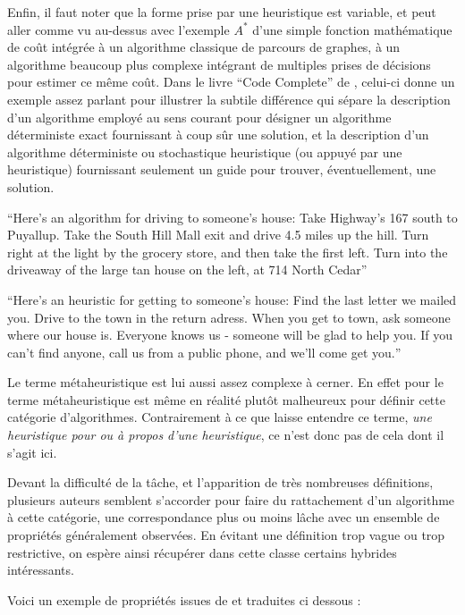 Enfin, il faut noter que la forme prise par une heuristique est variable, et peut aller comme vu au-dessus avec l'exemple $A^*$ d'une simple fonction mathématique de coût intégrée à un algorithme classique de parcours de graphes, à un algorithme beaucoup plus complexe intégrant de multiples prises de décisions pour estimer ce même coût. Dans le livre \enquote{Code Complete} de \textcite[12]{McConnell2004}, celui-ci donne un exemple assez parlant pour illustrer la subtile différence qui sépare la description d'un algorithme employé au sens courant pour désigner un algorithme déterministe exact fournissant à coup sûr une solution, et la description d'un algorithme déterministe ou stochastique heuristique (ou appuyé par une heuristique) fournissant seulement un guide pour trouver, éventuellement, une solution.

\foreignquote{english}{Here's an algorithm for driving to someone's house: Take Highway's 167 south to Puyallup. Take the South Hill Mall exit and drive 4.5 miles up the hill. Turn right at the light by the grocery store, and then take the first left. Turn into the driveaway of the large tan house on the left, at 714 North Cedar}

\foreignquote{english}{Here's an heuristic for getting to someone's house: Find the last letter we mailed you. Drive to the town in the return adress. When you get to town, ask someone where our house is. Everyone knows us - someone will be glad to help you. If you can't find anyone, call us from a public phone, and we'll come get you.}

Le terme métaheuristique est lui aussi assez complexe à cerner. En effet pour \textcite{Luke2013} le terme métaheuristique est même en réalité plutôt malheureux pour définir cette catégorie d'algorithmes. Contrairement à ce que laisse entendre ce terme, \textit{une heuristique pour ou à propos d'une heuristique}, ce n'est donc pas de cela dont il s'agit ici.

Devant la difficulté de la tâche, et l'apparition de très nombreuses définitions, plusieurs auteurs semblent s'accorder pour faire du rattachement d'un algorithme à cette catégorie, une correspondance plus ou moins lâche avec un ensemble de propriétés généralement observées. En évitant une définition trop vague ou trop restrictive, on espère ainsi récupérer dans cette classe certains hybrides intéressants. 

Voici un exemple de propriétés issues de \textcite{Blum2003} et traduites ci dessous :

